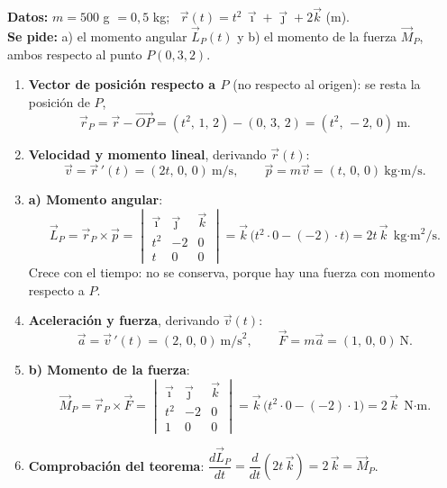 \documentclass[11pt,a4paper]{article}
\newcommand{\ii}{\vec{\imath}}
\newcommand{\jj}{\vec{\jmath}}
\newcommand{\kk}{\vec{k}}
\begin{document}
\begin{ejemplo}[title={Ejemplo: respecto a un punto distinto del origen}]
\textbf{Datos:} $m=500$ g $=0{,}5$ kg; \ $\vec r(t)=t^2\,\ii+\jj+2\kk$ (m).\\
\textbf{Se pide:} a) el momento angular $\vec L_P(t)$ y b) el momento de la fuerza $\vec M_P$, ambos respecto al punto $P(0,3,2)$.

\begin{enumerate}[itemsep=4pt]
  \item \textbf{Vector de posición respecto a $P$} (no respecto al origen): se resta la posición de $P$,
  \[\vec r_P=\vec r-\overrightarrow{OP}=(t^2,\,1,\,2)-(0,\,3,\,2)=(t^2,\,-2,\,0)\ \text{m}.\]
  \item \textbf{Velocidad y momento lineal}, derivando $\vec r(t)$:
  \[\vec v=\vec r\,'(t)=(2t,\,0,\,0)\ \text{m/s},\qquad \vec p=m\vec v=(t,\,0,\,0)\ \text{kg·m/s}.\]
  \item \textbf{a) Momento angular}:
  \[\vec L_P=\vec r_P\times\vec p=\begin{vmatrix}\ii&\jj&\kk\\t^2&-2&0\\t&0&0\end{vmatrix}=\kk\,\big(t^2\cdot0-(-2)\cdot t\big)=2t\,\kk\ \ \text{kg·m}^2\text{/s}.\]
  Crece con el tiempo: no se conserva, porque hay una fuerza con momento respecto a $P$.
  \item \textbf{Aceleración y fuerza}, derivando $\vec v(t)$:
  \[\vec a=\vec v\,'(t)=(2,\,0,\,0)\ \text{m/s}^2,\qquad \vec F=m\vec a=(1,\,0,\,0)\ \text{N}.\]
  \item \textbf{b) Momento de la fuerza}:
  \[\vec M_P=\vec r_P\times\vec F=\begin{vmatrix}\ii&\jj&\kk\\t^2&-2&0\\1&0&0\end{vmatrix}=\kk\,\big(t^2\cdot0-(-2)\cdot1\big)=2\,\kk\ \ \text{N·m}.\]
  \item \textbf{Comprobación del teorema}: $\dfrac{d\vec L_P}{dt}=\dfrac{d}{dt}(2t\,\kk)=2\,\kk=\vec M_P$. \checkmark
\end{enumerate}
\end{ejemplo}
\end{document}

